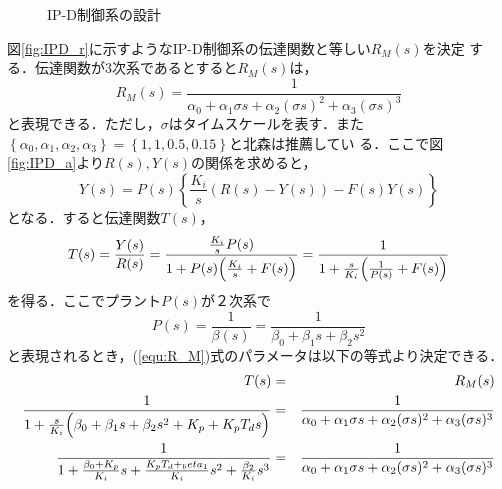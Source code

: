 \documentclass[a4paper,12pt]{jarticle}
\begin{document}
\begin{figure}[tbp]
  \begin{center} 
  \hfill
  \end{center}
  \caption{IP-D制御系の設計}
  \label{fig:IPD}
\end{figure}
%
図\ref{fig:IPD_r}に示すようなIP-D制御系の伝達関数と等しい$R_M(s)$を決定
する．伝達関数が3次系であるとすると$R_M(s)$は，
%
\begin{equation}\label{equ:R_M}
 R_M(s) = \frac{1}{\alpha_0+\alpha_1\sigma s+\alpha_2 (\sigma s)^2+\alpha_3(\sigma s)^3}
\end{equation}
%
と表現できる．ただし，$\sigma$はタイムスケールを表す．また
$\left\{\alpha_0,\alpha_1,\alpha_2,\alpha_3\right\}=\left\{1,1,0.5,0.15\right\}$と北森は推薦してい
る．ここで図\ref{fig:IPD_a}より$R(s),Y(s)$の関係を求めると，
%
\begin{equation}
 Y(s) = P(s)\left\{\frac{K_i}{s}(R(s)-Y(s))-F(s)Y(s) \right\}
\end{equation}
%
となる．すると伝達関数$T(s)$，
%
\begin{equation}
 T(s) = \frac{Y(s)}{R(s)} =
  \frac{\frac{K_i}{s}P(s)}{1+P(s)\Bigl(\frac{K_i}{s}+F(s)\Bigr)} =  \frac{1}{1+\frac{s}{K_i}\Bigl(\frac{1}{P(s)}+F(s)\Bigr)}
\end{equation}
%
を得る．ここでプラント$P(s)$が２次系で
%
\begin{equation}
 P(s) = \frac{1}{\beta (s)} = \frac{1}{\beta_0 + \beta_1 s + \beta_2 s^2}
\end{equation}
%
と表現されるとき，(\ref{equ:R_M})式のパラメータは以下の等式より決定できる．
%
\begin{eqnarray}
 T(s) & = & R_M(s) \nonumber \\
 \frac{1}{1+\frac{s}{K_i}\Bigl(\beta_0 + \beta_1 s + \beta_2 s^2 +
  K_p+K_p T_d s \Bigr)} & = & \frac{1}{\alpha_0+\alpha_1\sigma
  s+\alpha_2 (\sigma s)^2+\alpha_3(\sigma s)^3} \nonumber \\
 \frac{1}{1+\frac{\beta_0 + K_p}{K_i}s+\frac{K_pT_d+_beta_1}{K_i}s^2+\frac{\beta_2}{K_i}s^3}& = & \frac{1}{\alpha_0+\alpha_1\sigma s+\alpha_2 (\sigma s)^2+\alpha_3(\sigma s)^3}
\end{eqnarray}
%
\end{document}
